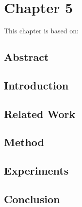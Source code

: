 \cleardoublepage
\chapter{Chapter 5}

\label{ch:5}

\newpage
This chapter is based on: 

\section*{Abstract}

\section{Introduction}

\section{Related Work}

\section{Method}

\section{Experiments}

\section{Conclusion}